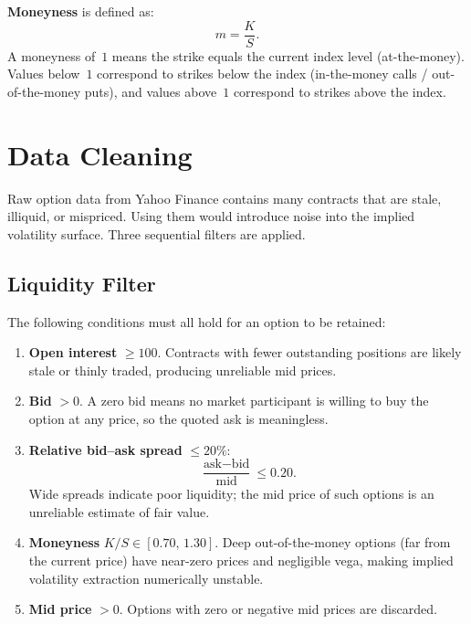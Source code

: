 \documentclass[12pt, a4paper]{article}
\begin{document}
\textbf{Moneyness} is defined as:
\begin{equation}
    m = \frac{K}{S}.
    \label{eq:moneyness}
\end{equation}
A moneyness of~$1$ means the strike equals the current index level
(at-the-money). Values below~$1$ correspond to strikes below the index (in-the-money
calls / out-of-the-money puts), and values above~$1$ correspond to strikes above
the index.

\section{Data Cleaning}
\label{sec:cleaning}

Raw option data from Yahoo Finance contains many contracts that are stale,
illiquid, or mispriced. Using them would introduce noise into the implied
volatility surface. Three sequential filters are applied.

\subsection{Liquidity Filter}

The following conditions must all hold for an option to be retained:
\begin{enumerate}[nosep]
    \item \textbf{Open interest} $\geq 100$. Contracts with fewer outstanding
          positions are likely stale or thinly traded, producing unreliable mid
          prices.
    \item \textbf{Bid} $> 0$. A zero bid means no market participant is willing
          to buy the option at any price, so the quoted ask is meaningless.
    \item \textbf{Relative bid--ask spread} $\leq 20\%$:
          \begin{equation}
              \frac{\text{ask} - \text{bid}}{\text{mid}} \leq 0.20.
              \label{eq:spread}
          \end{equation}
          Wide spreads indicate poor liquidity; the mid price of such options is
          an unreliable estimate of fair value.
    \item \textbf{Moneyness} $K/S \in [0.70,\, 1.30]$. Deep out-of-the-money
          options (far from the current price) have near-zero prices and
          negligible vega, making implied volatility extraction numerically
          unstable.
    \item \textbf{Mid price} $> 0$. Options with zero or negative mid prices
          are discarded.
\end{enumerate}
\end{document}
